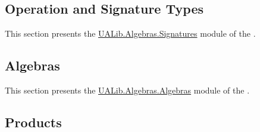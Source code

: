 \documentclass[a4paper,UKenglish,cleveref, autoref, thm-restate]{lipics-v2021}
\begin{document}
\subsection{Operation and Signature Types}\label{operation-and-signature-types}
This section presents the \href{}{UALib.Algebras.Signatures} module of the \agdaualib.


\subsection{Algebras}\label{sec:algebras-1}
This section presents the \href{}{UALib.Algebras.Algebras} module of the \agdaualib.


\subsection{Products}
\label{sec:products}




\end{document}
